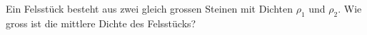 Ein Felsstück besteht aus zwei gleich grossen Steinen mit Dichten $\rho_1$ und $\rho_2$. Wie gross ist die mittlere Dichte des Felsstücks?
